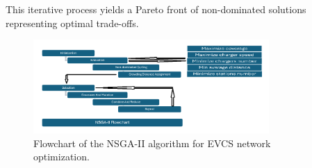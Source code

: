 This iterative process yields a Pareto front of non-dominated solutions representing optimal trade-offs.

\begin{figure}[h]
    \centering
    \includegraphics[width=0.8\textwidth]{..//Figures/evcs-nsga-flowchart.png}
    \caption{Flowchart of the NSGA-II algorithm for EVCS network optimization.}
    \label{fig:evcs_nsga_flowchart}
\end{figure}
